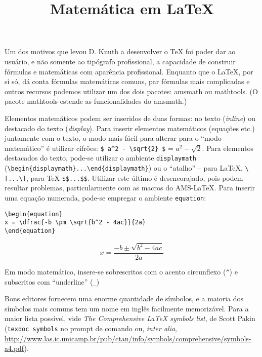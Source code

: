 \documentclass{scrartcl}
\begin{document}
\title{Matemática em {\selectfont\LaTeX}}
\maketitle
\date{}

Um dos motivos que levou D. Knuth a desenvolver o \TeX{} foi poder dar ao usuário, e não somente ao tipógrafo profissional, a capacidade de construir fórmulas e matemáticas com aparência profissional. Enquanto que  o \LaTeX, por si só, dá conta fórmulas matemáticas comuns, par fórmulas mais complicadas e outros recursos podemos utilizar um dos dois pacotes: \textsf{amsmath} ou \textsf{mathtools}. (O pacote \textsf{mathtools} estende as funcionalidades do \textsf{amsmath}.)

Elementos matemáticos podem ser inseridos de duas formas: no texto (\textit{inline}) ou destacado do texto (\textit{display}). Para inserir elementos matemáticos (equações etc.) juntamente com o texto, o modo mais fácil para alterar para o ``modo matemático'' é utilizar cifrões: \verb+$ a^2 - \sqrt{2} $+ = $ a^2 - \sqrt{2} $. Para elementos destacados do texto, pode-se utilizar o ambiente \texttt{displaymath} (\verb+\begin{displaymath}...\end{displaymath}+) ou o ``atalho'' -- para \LaTeX{}, \verb+\[...\]+,\index{\verb+\[...\]+} para \TeX{} \verb+$$...$$+. Utilizar este último é desencorajado, pois podem resultar problemas, particularmente com as macros do AMS-\LaTeX. Para inserir uma equação numerada, pode-se empregar o ambiente \texttt{equation}:

\begin{verbatim}
\begin{equation}
x = \dfrac{-b \pm \sqrt{b^2 - 4ac}}{2a}
\end{equation}
\end{verbatim}


\begin{equation}
x = \dfrac{-b \pm \sqrt{b^2 - 4ac}}{2a}
\end{equation}


Em modo matemático, insere-se sobrescritos  com o acento circunflexo (\verb+^+) e subscritos  com ``underline'' (\verb+_+)

Bons editores fornecem uma enorme quantidade de símbolos, e a maioria dos símbolos mais comuns tem um nome em inglês facilmente memorizável. Para a maior lista possível, vide \textit{The Comprehensive \LaTeX{} symbols list}, de Scott Pakin (\verb+texdoc symbols+ no prompt de comando ou, \textit{inter alia}, \url{http://www.las.ic.unicamp.br/pub/ctan/info/symbols/comprehensive/symbols-a4.pdf}). 
\end{document}
